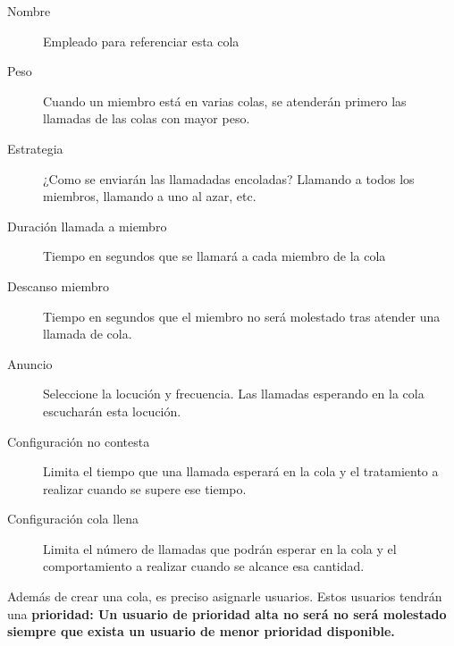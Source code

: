 \documentclass[letterpaper,10pt,spanish]{sphinxmanual}
\begin{document}
\begin{description}
\item[{Nombre}] \leavevmode{}\label{pbx_features/queues:term-name}
Empleado para referenciar esta cola

\item[{Peso}] \leavevmode{}\label{pbx_features/queues:term-weight}
Cuando un miembro está en varias colas, se atenderán primero las llamadas de las colas con mayor peso.

\item[{Estrategia}] \leavevmode{}\label{pbx_features/queues:term-strategy}
¿Como se enviarán las llamadadas encoladas? Llamando a todos los miembros, llamando a uno al azar, etc.

\item[{Duración llamada a miembro}] \leavevmode{}\label{pbx_features/queues:term-member-call-seconds}
Tiempo en segundos que se llamará a cada miembro de la cola

\item[{Descanso miembro}] \leavevmode{}\label{pbx_features/queues:term-member-rest-seconds}
Tiempo en segundos que el miembro no será molestado tras atender una llamada de cola.

\item[{Anuncio}] \leavevmode{}\label{pbx_features/queues:term-announce}
Seleccione la locución y frecuencia. Las llamadas esperando en la cola escucharán esta locución.

\item[{Configuración no contesta}] \leavevmode{}\label{pbx_features/queues:term-timeout-configuration}
Limita el tiempo que una llamada esperará en la cola y el tratamiento a realizar cuando se supere ese tiempo.

\item[{Configuración cola llena}] \leavevmode{}\label{pbx_features/queues:term-full-queue-configuration}
Limita el número de llamadas que podrán esperar en la cola y el comportamiento a realizar cuando se alcance esa cantidad.

\end{description}

Además de crear una cola, es preciso asignarle usuarios. Estos usuarios tendrán una \textbf{prioridad: Un usuario de prioridad alta no será no será molestado siempre que exista un usuario de menor prioridad disponible.}
\end{document}
